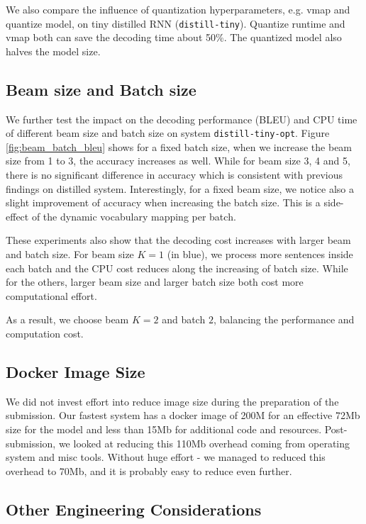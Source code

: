 \documentclass[11pt,a4paper]{article}
\begin{document}
We also compare the influence of quantization hyperparameters, e.g. vmap and quantize model, on tiny distilled RNN ({\tt distill-tiny}).
Quantize runtime and vmap both can save the decoding time about 50\%.
The quantized model also halves the model size.

\subsection{Beam size and Batch size}

We further test the impact on the decoding performance (BLEU) and CPU
time of different beam size and batch size on system {\tt distill-tiny-opt}.
Figure \ref{fig:beam_batch_bleu} shows for a fixed batch size, when we
increase the beam size from 1 to 3, the accuracy increases as well.
While for beam size 3, 4 and 5, there is no significant difference in
accuracy which is consistent with previous findings on distilled
system.  Interestingly, for a fixed beam size, we notice also a slight
improvement of accuracy when increasing the batch size. This is a
side-effect of the dynamic vocabulary mapping per batch.

%
These experiments also show that the decoding cost increases with
larger beam and batch size.  For beam size $K=1$ (in blue), we process
more sentences inside each batch and the CPU cost reduces along the
increasing of batch size.  While for the others, larger beam size and
larger batch size both cost more computational effort.

As a result,
we choose beam $K=2$ and batch $2$, balancing the performance and
computation cost.

%

\subsection{Docker Image Size}

We did not invest effort into reduce image size during the preparation
of the submission. Our fastest system has a docker image of 200M for
an effective 72Mb size for the model and less than 15Mb for additional
code and resources. Post-submission, we looked at reducing this 110Mb
overhead coming from operating system and misc tools. Without huge effort - we managed to reduced
this overhead to 70Mb, and it is probably easy to reduce even further.

\subsection{Other Engineering Considerations}
\end{document}
